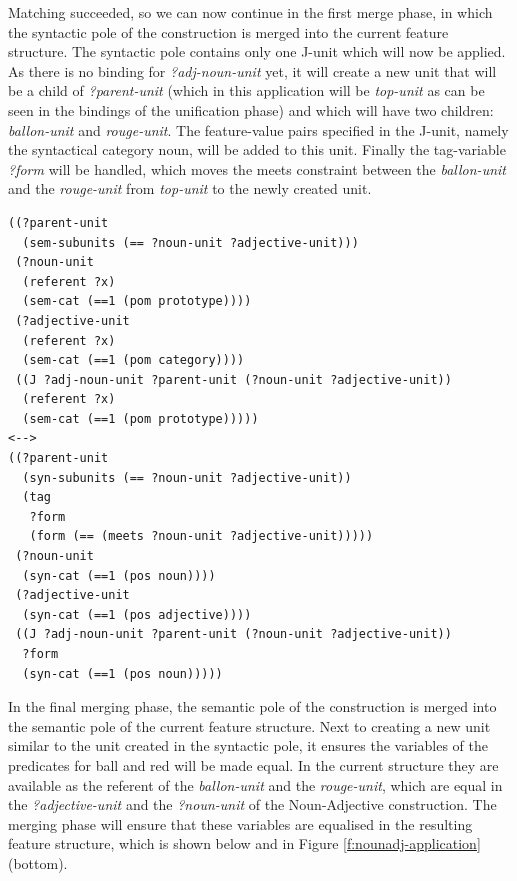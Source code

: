Matching succeeded, so we can now continue in the first merge phase,
in which the syntactic pole of the construction is merged into the
current feature structure. The syntactic pole contains only one J-unit
which will now be applied. As there is no binding for
\emph{?adj-noun-unit} yet, it will create a new unit that will be a
child of \emph{?parent-unit} (which in this application will be
\emph{top-unit} as can be seen in the bindings of the unification
phase) and which will have two children: \emph{ballon-unit} and
\emph{rouge-unit}. The feature-value pairs specified in the J-unit,
namely the syntactical category noun, will be added to this
unit. Finally the tag-variable \emph{?form} will be handled, which
moves the meets constraint between the \emph{ballon-unit} and the
\emph{rouge-unit} from \emph{top-unit} to the newly created unit.

\footnotesize
\begin{Verbatim}[frame=lines, label=The Noun-Adjective construction]
((?parent-unit
  (sem-subunits (== ?noun-unit ?adjective-unit)))
 (?noun-unit 
  (referent ?x) 
  (sem-cat (==1 (pom prototype))))
 (?adjective-unit
  (referent ?x)
  (sem-cat (==1 (pom category))))
 ((J ?adj-noun-unit ?parent-unit (?noun-unit ?adjective-unit))
  (referent ?x)
  (sem-cat (==1 (pom prototype)))))
<-->
((?parent-unit
  (syn-subunits (== ?noun-unit ?adjective-unit))
  (tag
   ?form
   (form (== (meets ?noun-unit ?adjective-unit)))))
 (?noun-unit 
  (syn-cat (==1 (pos noun))))
 (?adjective-unit 
  (syn-cat (==1 (pos adjective))))
 ((J ?adj-noun-unit ?parent-unit (?noun-unit ?adjective-unit))
  ?form
  (syn-cat (==1 (pos noun)))))
\end{Verbatim}
\normalsize

In the final merging phase, the semantic pole of the construction is
merged into the semantic pole of the current feature structure. Next
to creating a new unit similar to the unit created in the syntactic
pole, it ensures the variables of the predicates for ball and red will
be made equal. In the current structure they are available as the
referent of the \emph{ballon-unit} and the \emph{rouge-unit}, which
are equal in the \emph{?adjective-unit} and the \emph{?noun-unit} of
the Noun-Adjective construction. The merging phase will ensure that
these variables are equalised in the resulting feature structure,
which is shown below and in Figure \ref{f:nounadj-application}
(bottom).

